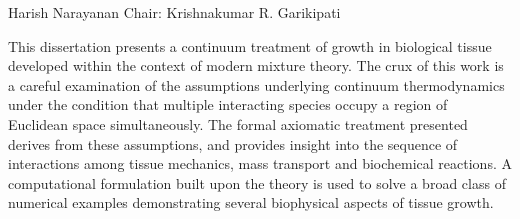  {Harish Narayanan} {Chair: Krishnakumar
  R. Garikipati}

This dissertation presents a continuum treatment of growth in
biological tissue developed within the context of modern mixture
theory. The crux of this work is a careful examination of the
assumptions underlying continuum thermodynamics under the condition
that multiple interacting species occupy a region of Euclidean space
simultaneously. The formal axiomatic treatment presented derives from
these assumptions, and provides insight into the sequence of
interactions among tissue mechanics, mass transport and biochemical
reactions. A computational formulation built upon the theory is used
to solve a broad class of numerical examples demonstrating several
biophysical aspects of tissue growth.

\thispagestyle{empty}
